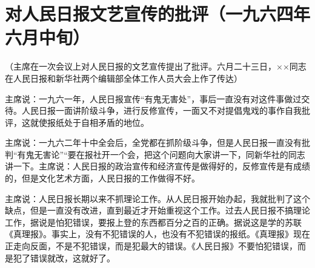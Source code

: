 \section[对人民日报文艺宣传的批评（一九六四年六月中旬）]{对人民日报文艺宣传的批评（一九六四年六月中旬）}


（主席在一次会议上对人民日报的文艺宣传提出了批评。六月二十三日，××同志在人民日报和新华社两个编辑部全体工作人员大会上作了传达）

主席说：一九六一年，人民日报宣传“有鬼无害处”，事后一直没有对这件事做过交待。人民日报一面讲阶级斗争，进行反修宣传，一面又不对提倡鬼戏的事作自我批评，这就使报纸处于自相矛盾的地位。

主席说：一九六二年十中全会后，全党都在抓阶级斗争，但是人民日报一直没有批判“有鬼无害论”“要在报社开一个会，把这个问题向大家讲一下，同新华社的同志讲一下。主席说：人民日报的政治宣传和经济宣传是做得好的，反修宣传是有成绩的，但是文化艺术方面，人民日报的工作做得不好。

主席说：人民日报长期以来不抓理论工作。从人民日报开始办起，我就批判了这个缺点，但是一直没有改进，直到最近才开始重视这个工作。过去人民日报不搞理论工作，据说是怕犯错误，要报上登的东西都百分之百的正确。据说这是学的苏联《真理报》。事实上，没有不犯错误的人，也没有不犯错误的报纸。《真理报》现在正走向反面，不是不犯错误，而是犯最大的错误。《人民日报》不要怕犯错误，而是犯了错误就改，这就好了。


